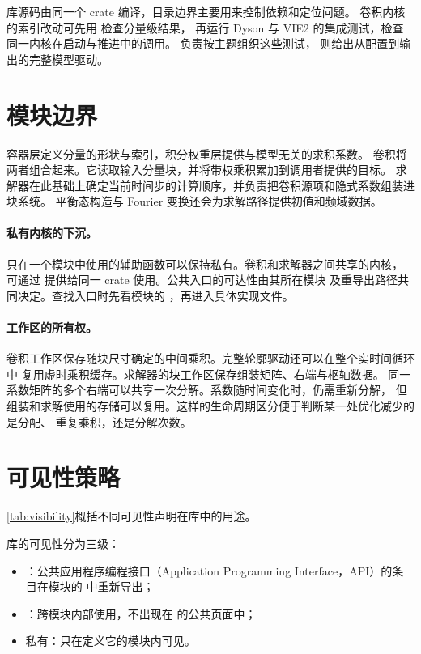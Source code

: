 库源码由同一个 crate 编译，目录边界主要用来控制依赖和定位问题。
卷积内核的索引改动可先用  检查分量级结果，
再运行 Dyson 与 VIE2 的集成测试，检查同一内核在启动与推进中的调用。
 负责按主题组织这些测试， 则给出从配置到输出的完整模型驱动。

\section{模块边界}
\label{sec:module-boundary}

容器层定义分量的形状与索引，积分权重层提供与模型无关的求积系数。
卷积将两者组合起来。它读取输入分量块，并将带权乘积累加到调用者提供的目标。
求解器在此基础上确定当前时间步的计算顺序，并负责把卷积源项和隐式系数组装进块系统。
平衡态构造与 Fourier 变换还会为求解路径提供初值和频域数据。

\paragraph{私有内核的下沉。}
只在一个模块中使用的辅助函数可以保持私有。卷积和求解器之间共享的内核，
可通过  提供给同一 crate 使用。公共入口的可达性由其所在模块
及重导出路径共同决定。查找入口时先看模块的 ，再进入具体实现文件。

\paragraph{工作区的所有权。}
卷积工作区保存随块尺寸确定的中间乘积。完整轮廓驱动还可以在整个实时间循环中
复用虚时乘积缓存。求解器的块工作区保存组装矩阵、右端与枢轴数据。
同一系数矩阵的多个右端可以共享一次分解。系数随时间变化时，仍需重新分解，
但组装和求解使用的存储可以复用。这样的生命周期区分便于判断某一处优化减少的是分配、
重复乘积，还是分解次数。

\section{可见性策略}
\label{sec:visibility}

\cref{tab:visibility}概括不同可见性声明在库中的用途。

库的可见性分为三级：
\begin{itemize}
    \item {}：公共应用程序编程接口（Application Programming Interface，API）的条目在模块的  中重新导出；
    \item {}：跨模块内部使用，不出现在 
          的公共页面中；
    \item 私有：只在定义它的模块内可见。
\end{itemize}


